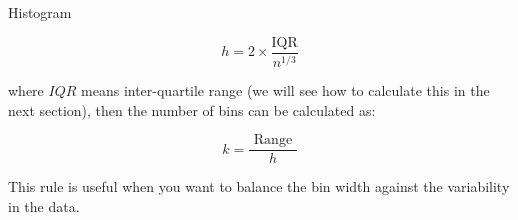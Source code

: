 \documentclass[8pt, usepdftitle=false]{beamer}
\begin{document}
\begin{frame}[allowframebreaks]{Histogram}
\begin{itemize}
\begin{itemize}
$$
h=2 \times \frac{\mathrm{IQR}}{n^{1 / 3}}
$$


where $IQR$ means inter-quartile range (we will see how to calculate this in the next section), then the number of bins can be calculated as:

$$
k=\frac{\text { Range }}{h}
$$


This rule is useful when you want to balance the bin width against the variability in the data.
\end{itemize}
















\end{itemize}
\end{frame}
\end{document}
